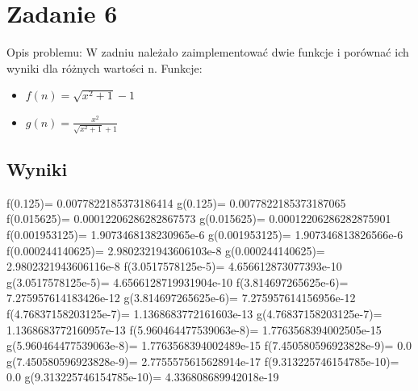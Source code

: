 \documentclass{article}
\begin{document}
\section{Zadanie 6}
Opis problemu: \newline
W zadniu należało zaimplementować dwie funkcje i porównać ich wyniki dla różnych wartości n.\newline
Funkcje:
\begin{itemize}
    \item $f(n) = \sqrt{x^{2}+1}-1$
    \item $g(n) = \frac{x^{2}}{\sqrt{x^{2}+1}+1}$
\end{itemize}
\subsection{Wyniki}
f(0.125)= 0.0077822185373186414\newline
g(0.125)= 0.0077822185373187065\newline
f(0.015625)= 0.00012206286282867573\newline
g(0.015625)= 0.00012206286282875901\newline
f(0.001953125)= 1.9073468138230965e-6\newline
g(0.001953125)= 1.907346813826566e-6\newline
f(0.000244140625)= 2.9802321943606103e-8\newline
g(0.000244140625)= 2.9802321943606116e-8\newline
f(3.0517578125e-5)= 4.656612873077393e-10\newline
g(3.0517578125e-5)= 4.6566128719931904e-10\newline
f(3.814697265625e-6)= 7.275957614183426e-12\newline
g(3.814697265625e-6)= 7.275957614156956e-12\newline
f(4.76837158203125e-7)= 1.1368683772161603e-13\newline
g(4.76837158203125e-7)= 1.1368683772160957e-13\newline
f(5.960464477539063e-8)= 1.7763568394002505e-15\newline
g(5.960464477539063e-8)= 1.7763568394002489e-15\newline
f(7.450580596923828e-9)= 0.0\newline
g(7.450580596923828e-9)= 2.7755575615628914e-17\newline
f(9.313225746154785e-10)= 0.0\newline
g(9.313225746154785e-10)= 4.336808689942018e-19\newline
\end{document}
